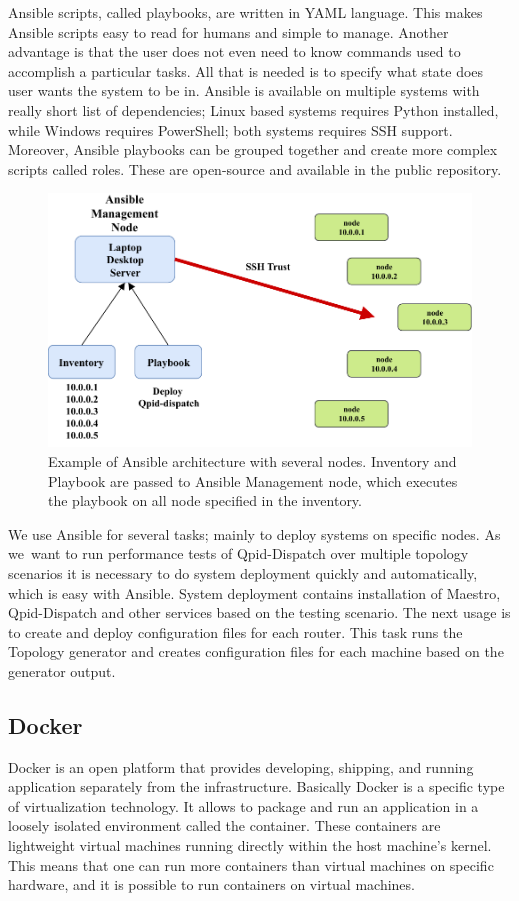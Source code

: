 Ansible scripts, called playbooks, are written in YAML language. This makes Ansible scripts easy to read for humans and simple to manage. Another advantage is that the user does not even need to know commands used to accomplish a particular tasks. All that is needed is to specify what state does user wants the system to be in. Ansible is available on multiple systems with really short list of dependencies; Linux based systems requires Python installed, while Windows requires PowerShell; both systems requires SSH support. Moreover, Ansible playbooks can be grouped together and create more complex scripts called roles. These are open-source and available in the public repository.

\begin{figure}[H]
  \centering
  \includegraphics[width=12cm]{obrazky-figures/ansible_architecture.pdf}
  \caption{Example of Ansible architecture with several nodes. Inventory and Playbook are passed to Ansible Management node, which executes the playbook on all node specified in the inventory.}
  \label{fig:ansible_architecture}
\end{figure}

We use Ansible for several tasks; mainly to deploy systems on specific nodes. As we~want to run performance tests of Qpid-Dispatch over multiple topology scenarios it is necessary to do system deployment quickly and automatically, which is easy with Ansible. System deployment contains installation of Maestro, Qpid-Dispatch and other services based on the testing scenario. The next usage is to create and deploy configuration files for each router. This task runs the Topology generator and creates configuration files for each machine based on the generator output.


\subsection{Docker}
Docker \cite{Docker} is an open platform that provides developing, shipping, and running application separately from the infrastructure. Basically Docker is a specific type of virtualization technology. It allows to package and run an application in a loosely isolated environment called the container. These containers are lightweight virtual machines running directly within the host machine's kernel. This means that one can run more containers than virtual machines on specific hardware, and it is possible to run containers on virtual machines.

